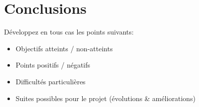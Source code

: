 \chapter{Conclusions}

Développez en tous cas les points suivants:
\begin{itemize}
  \item Objectifs atteints / non-atteints
  \item Points positifs / négatifs
  \item Difficultés particulières
  \item Suites possibles pour le projet (évolutions \& améliorations)
\end{itemize}
